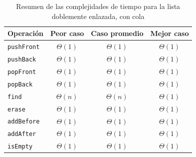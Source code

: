 \begin{table}[htbp]
  \centering{}
  \begin{tabular}{lccc}
    \toprule
    Operación & Peor caso & Caso promedio & Mejor caso \\
    \midrule
    \texttt{pushFront} & $\Theta{} (1)$ & $\Theta{} (1)$ & $\Theta{} (1)$ \\
    \texttt{pushBack} & $\Theta{} (1)$ & $\Theta{} (1)$ & $\Theta{} (1)$ \\
    \texttt{popFront} & $\Theta{} (1)$ & $\Theta{} (1)$ & $\Theta{} (1)$ \\
    \texttt{popBack} & $\Theta{} (1)$ & $\Theta{} (1)$ & $\Theta{} (1)$ \\
    \texttt{find} & $\Theta{} (n)$ & $\Theta{} (n)$ & $\Theta{} (1)$ \\
    \texttt{erase} & $\Theta{} (1)$ & $\Theta{} (1)$ & $\Theta{} (1)$ \\
    \texttt{addBefore} & $\Theta{} (1)$ & $\Theta{} (1)$ & $\Theta{} (1)$ \\
    \texttt{addAfter} & $\Theta{} (1)$ & $\Theta{} (1)$ & $\Theta{} (1)$ \\
    \texttt{isEmpty} & $\Theta{} (1)$ & $\Theta{} (1)$ & $\Theta{} (1)$ \\
    \bottomrule
  \end{tabular}
  \caption{Resumen de las complejidades de tiempo para la lista doblemente enlazada, con cola}
  \label{tab:resumen-doble-con-cola}
\end{table}

